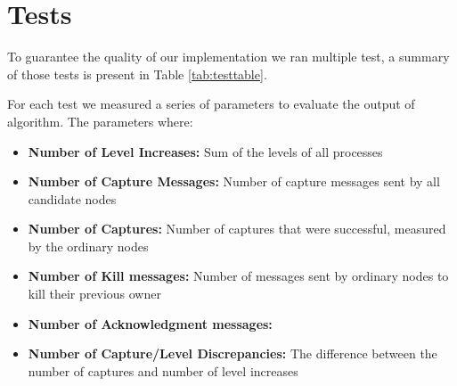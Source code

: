\section*{Tests}

To guarantee the quality of our implementation we ran multiple test, a summary of those tests is present in Table \ref{tab:testtable}.

For each test we measured a series of parameters to evaluate the output of algorithm. The parameters where:

\begin{itemize}
\item{\textbf{Number of Level Increases:}} Sum of the levels of all processes 
\item{\textbf{Number of Capture Messages:}} Number of capture messages sent by all candidate nodes
\item{\textbf{Number of Captures:}} Number of captures that were successful, measured by the ordinary nodes
\item{\textbf{Number of Kill messages:}} Number of messages sent by ordinary nodes to kill their previous owner
\item{\textbf{Number of Acknowledgment messages:}}
\item{\textbf{Number of Capture/Level Discrepancies:}} The difference between the number of captures and number of level increases 

\end{itemize}

\begin{table}[h] 
\centering
{}
\caption{}\label{tab:testtable}
\end{table}

